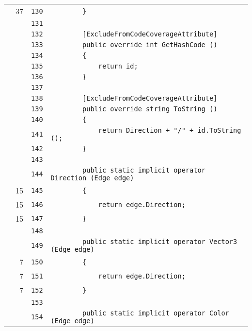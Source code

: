 \documentclass[a4paper,10pt]{article}
\begin{document}
\begin{longtable}[l]{lrrl}
\cellcolor{green} & 37 & \verb~130~ & \verb~        }~\\
\cellcolor{gray} &  & \verb~131~ & \verb~~\\
\cellcolor{gray} &  & \verb~132~ & \verb~        [ExcludeFromCodeCoverageAttribute]~\\
\cellcolor{gray} &  & \verb~133~ & \verb~        public override int GetHashCode ()~\\
\cellcolor{gray} &  & \verb~134~ & \verb~        {~\\
\cellcolor{gray} &  & \verb~135~ & \verb~            return id;~\\
\cellcolor{gray} &  & \verb~136~ & \verb~        }~\\
\cellcolor{gray} &  & \verb~137~ & \verb~~\\
\cellcolor{gray} &  & \verb~138~ & \verb~        [ExcludeFromCodeCoverageAttribute]~\\
\cellcolor{gray} &  & \verb~139~ & \verb~        public override string ToString ()~\\
\cellcolor{gray} &  & \verb~140~ & \verb~        {~\\
\cellcolor{gray} &  & \verb~141~ & \verb~            return Direction + "/" + id.ToString ();~\\
\cellcolor{gray} &  & \verb~142~ & \verb~        }~\\
\cellcolor{gray} &  & \verb~143~ & \verb~~\\
\cellcolor{gray} &  & \verb~144~ & \verb~        public static implicit operator Direction (Edge edge)~\\
\cellcolor{green} & 15 & \verb~145~ & \verb~        {~\\
\cellcolor{green} & 15 & \verb~146~ & \verb~            return edge.Direction;~\\
\cellcolor{green} & 15 & \verb~147~ & \verb~        }~\\
\cellcolor{gray} &  & \verb~148~ & \verb~~\\
\cellcolor{gray} &  & \verb~149~ & \verb~        public static implicit operator Vector3 (Edge edge)~\\
\cellcolor{green} & 7 & \verb~150~ & \verb~        {~\\
\cellcolor{green} & 7 & \verb~151~ & \verb~            return edge.Direction;~\\
\cellcolor{green} & 7 & \verb~152~ & \verb~        }~\\
\cellcolor{gray} &  & \verb~153~ & \verb~~\\
\cellcolor{gray} &  & \verb~154~ & \verb~        public static implicit operator Color (Edge edge)~\\

\end{longtable}
\end{document}
